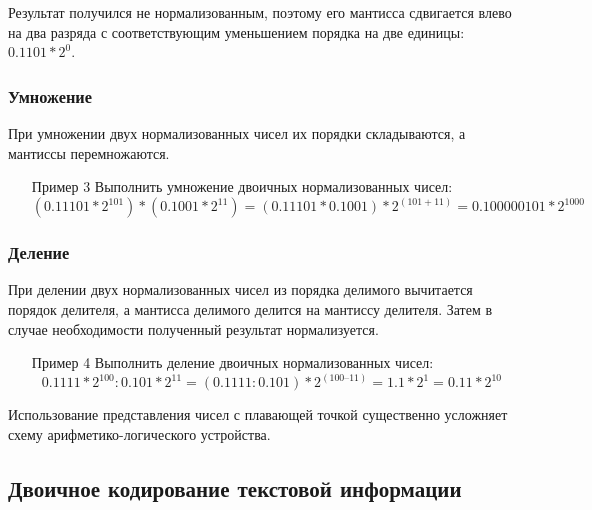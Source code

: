 \documentclass[a4paper]{article}
\begin{document}
Результат получился не нормализованным, поэтому его мантисса сдвигается влево на два разряда с соответствующим уменьшением порядка на две единицы: $0.1101*2^{0}$.
\subsubsection{Умножение}
При умножении двух нормализованных чисел их порядки складываются, а мантиссы перемножаются.
\begin{itemize}
\item[Пример 3] Выполнить умножение двоичных нормализованных чисел:
    $$(0.11101*2^{101})*(0.1001*2^{11}) = (0.11101*0.1001)* 2^{(101+11)} = 0.100000101*2^{1000}$$
\end{itemize}
\subsubsection{Деление}
При делении двух нормализованных чисел из порядка делимого вычитается порядок делителя, а мантисса делимого делится на мантиссу делителя. Затем в случае необходимости полученный результат нормализуется.
\begin{itemize}
\item[Пример 4] Выполнить деление двоичных нормализованных чисел:
    \[0.1111*2^{100} : 0.101*2^{11} = (0.1111 : 0.101) * 2^{(100–11)} = 1.1*2^{1} = 0.11*2^{10}\]
\end{itemize}
Использование представления чисел с плавающей точкой существенно усложняет схему арифметико-логического устройства.

\subsection{Двоичное кодирование текстовой информации}
\end{document}
